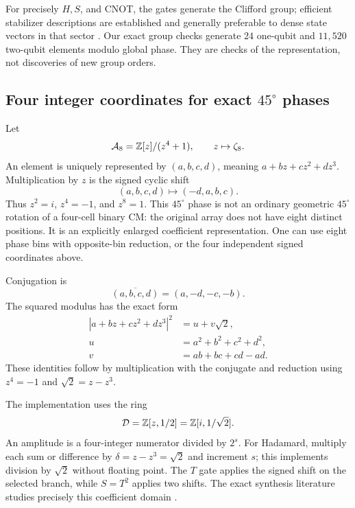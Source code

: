 For precisely $H,S$, and CNOT, the gates generate the Clifford group; efficient stabilizer descriptions are established and generally preferable to dense state vectors in that sector \cite{aaronson}. Our exact group checks generate $24$ one-qubit and $11{,}520$ two-qubit elements modulo global phase. They are checks of the representation, not discoveries of new group orders.

\subsection{Four integer coordinates for exact \texorpdfstring{$45^\circ$}{45-degree} phases}
Let
\begin{equation}
 \mathcal A_8=\mathbb Z[z]/(z^4+1),\qquad z\mapsto\zeta_8.
\end{equation}
An element is uniquely represented by $(a,b,c,d)$, meaning $a+bz+cz^2+dz^3$. Multiplication by $z$ is the signed cyclic shift
\begin{equation}
 (a,b,c,d)\longmapsto(-d,a,b,c).
\end{equation}
Thus $z^2=i$, $z^4=-1$, and $z^8=1$. This $45^\circ$ phase is not an ordinary geometric $45^\circ$ rotation of a four-cell binary CM: the original array does not have eight distinct positions. It is an explicitly enlarged coefficient representation. One can use eight phase bins with opposite-bin reduction, or the four independent signed coordinates above.

Conjugation is
\begin{equation}
 \overline{(a,b,c,d)}=(a,-d,-c,-b).
\end{equation}
The squared modulus has the exact form
\begin{align}\label{eq:C8norm}
 |a+bz+cz^2+dz^3|^2&=u+v\sqrt2,\\
 u&=a^2+b^2+c^2+d^2,\nonumber\\
 v&=ab+bc+cd-ad.\nonumber
\end{align}
These identities follow by multiplication with the conjugate and reduction using $z^4=-1$ and $\sqrt2=z-z^3$.

The implementation uses the ring
\begin{equation}\label{eq:ring}
 \mathcal D=\mathbb Z[z,1/2]=\mathbb Z[i,1/\sqrt2].
\end{equation}
An amplitude is a four-integer numerator divided by $2^s$. For Hadamard, multiply each sum or difference by $\delta=z-z^3=\sqrt2$ and increment $s$; this implements division by $\sqrt2$ without floating point. The $T$ gate applies the signed shift on the selected branch, while $S=T^2$ applies two shifts. The exact synthesis literature studies precisely this coefficient domain \cite{giles,kmm}.

